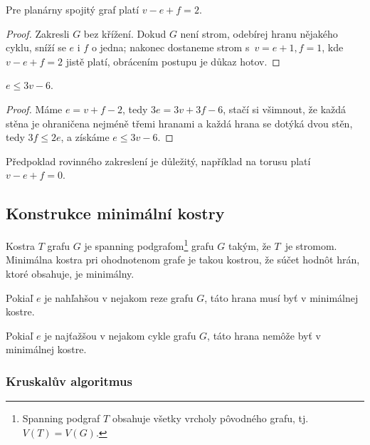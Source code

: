 \begin{theorem}[Euler]
Pre planárny spojitý graf platí 
$v - e + f = 2$.
\end{theorem}

\begin{proof}
Zakresli $G$ bez křížení.  Dokud
$G$ není strom, odebírej hranu nějakého cyklu, sníží se $e$ i $f$ o
jedna; nakonec dostaneme strom s~$v = e + 1, f = 1$, kde $v - e + f = 2$
jistě platí, obrácením postupu je důkaz hotov.
\end{proof}

\begin{corollary}
$e \leq 3v - 6$.
\end{corollary}

\begin{proof}
Máme $e = v + f - 2$, tedy $3e = 3v + 3f -
6$, stačí si všimnout, že každá stěna je ohraničena nejméně třemi
hranami a každá hrana se dotýká dvou stěn, tedy $3f \leq 2e$,
a získáme $e \leq 3v - 6$.
\end{proof}

\begin{note}
    Předpoklad rovinného zakreslení je důležitý,
    například na torusu platí $v - e + f = 0$.
\end{note}

\subsection{Konstrukce minimální kostry}

Kostra $T$ grafu $G$ je spanning podgrafom\footnote{Spanning podgraf $T$
obsahuje všetky vrcholy pôvodného grafu, tj. $V(T)=V(G)$.} grafu $G$ takým,
že $T$~je stromom. Minimálna kostra pri ohodnotenom grafe je takou kostrou,
že súčet hodnôt hrán, ktoré obsahuje, je minimálny.

\begin{theorem}
	Pokiaľ $e$ je nahľahšou v nejakom reze grafu $G$, táto hrana musí
	byť v minimálnej kostre.
\end{theorem}

\begin{theorem}
	Pokiaľ $e$ je najťažšou v nejakom cykle grafu $G$, táto hrana nemôže
	byť v minimálnej kostre.
\end{theorem}

\subsubsection*{Kruskalův algoritmus}


